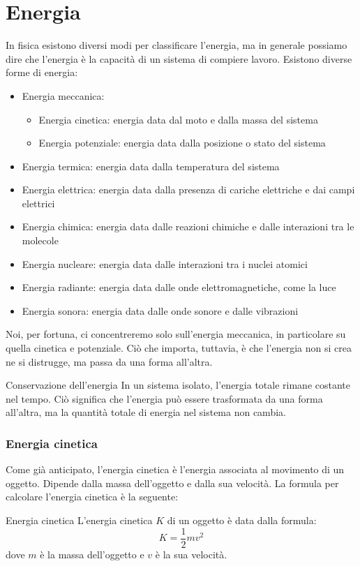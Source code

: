 \section{Energia}
In fisica esistono diversi modi per classificare l'energia, ma in generale possiamo dire che l'energia è la capacità di un sistema di compiere lavoro. Esistono diverse forme di energia:
\begin{itemize}
	\item Energia meccanica:
	      \begin{itemize}
		      \item Energia cinetica: energia data dal moto e dalla massa del sistema
		      \item Energia potenziale: energia data dalla posizione o stato del sistema
	      \end{itemize}
	\item Energia termica: energia data dalla temperatura del sistema
	\item Energia elettrica: energia data dalla presenza di cariche elettriche e dai campi elettrici
	\item Energia chimica: energia data dalle reazioni chimiche e dalle interazioni tra le molecole
	\item Energia nucleare: energia data dalle interazioni tra i nuclei atomici
	\item Energia radiante: energia data dalle onde elettromagnetiche, come la luce
	\item Energia sonora: energia data dalle onde sonore e dalle vibrazioni
\end{itemize}
Noi, per fortuna, ci concentreremo solo sull'energia meccanica, in particolare su quella cinetica e potenziale. Ciò che importa, tuttavia, è che l'energia non si crea ne si distrugge, ma passa da una forma all'altra.
\begin{teorema}{Conservazione dell'energia}
	In un sistema isolato, l'energia totale rimane costante nel tempo. Ciò significa che l'energia può essere trasformata da una forma all'altra, ma la quantità totale di energia nel sistema non cambia.
\end{teorema}
\subsubsection{Energia cinetica}
Come già anticipato, l'energia cinetica è l'energia associata al movimento di un oggetto. Dipende dalla massa dell'oggetto e dalla sua velocità. La formula per calcolare l'energia cinetica è la seguente:
\begin{definizione}{Energia cinetica}
	L'energia cinetica $ K $ di un oggetto è data dalla formula:
	\[
		K = \frac{1}{2} m v^2
	\]
	dove $ m $ è la massa dell'oggetto e $ v $ è la sua velocità.
\end{definizione}

